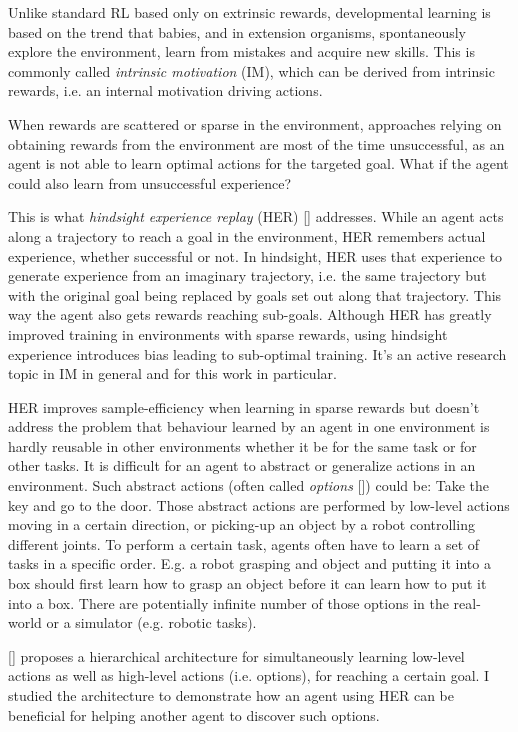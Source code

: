 \documentclass[conference]{IEEEtran}
\begin{document}
Unlike standard RL based only on extrinsic rewards, developmental learning is based on the trend that babies, and in extension organisms, spontaneously explore the environment, learn from mistakes and acquire new skills. This is commonly called \textit{intrinsic motivation} (IM), which can be derived from intrinsic rewards, i.e. an internal motivation driving actions. 

When rewards are scattered or sparse in the environment, approaches relying on obtaining rewards from the environment are most of the time unsuccessful, as an agent is not able to learn optimal actions for the targeted goal. What if the agent could also learn from unsuccessful experience? 

This is what \textit{hindsight experience replay} (HER) [\cite{andrychowicz2017hindsight}] addresses. While an agent acts along a trajectory to reach a goal in the environment, HER remembers actual experience, whether successful or not. In hindsight, HER uses that experience to  generate experience from an imaginary trajectory, i.e. the same trajectory but with the original goal being replaced by goals set out along that trajectory. This way the agent also gets rewards reaching sub-goals. Although HER has greatly improved training in environments with sparse rewards, using hindsight experience introduces bias leading to sub-optimal training. It's an active research topic in IM in general and for this work in particular.

HER improves sample-efficiency when learning in sparse rewards but doesn't address the problem that behaviour learned by an agent in one environment is hardly reusable in other environments whether it be for the same task or for other tasks. It is difficult for an agent to abstract or generalize actions in an environment. Such abstract actions (often called \textit{options} [\cite{sutton1999between}]) could be: Take the key and go to the door. Those abstract actions are performed by low-level actions moving in a certain direction, or picking-up an object by a robot controlling different joints. To perform a certain task, agents often have to learn a set of tasks in a specific order. E.g. a robot grasping and object and putting it into a box should first learn how to grasp an object before it can learn how to put it into a box. There are potentially infinite number of those options in the real-world or a simulator (e.g. robotic tasks).

[\cite{bacon2017option}] proposes a hierarchical architecture for simultaneously learning low-level actions as well as high-level actions (i.e. options), for reaching a certain goal. I studied the architecture to demonstrate how an agent using HER can be beneficial for helping another agent to discover such options.
\end{document}
